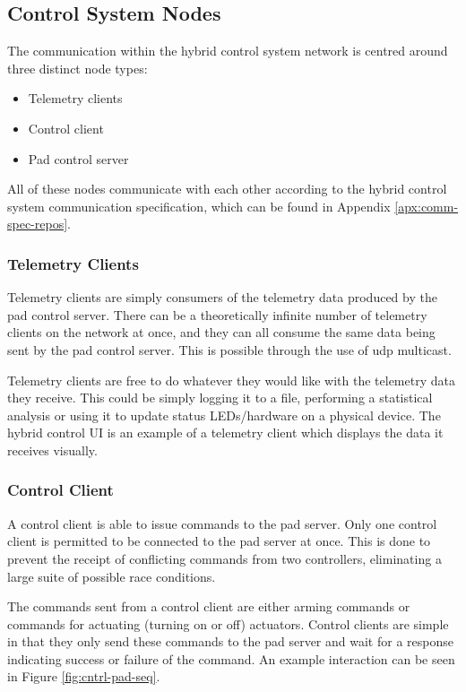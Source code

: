 \subsection{Control System Nodes}

The communication within the hybrid control system network is centred around three distinct node types:

\begin{itemize}
    \item Telemetry clients
    \item Control client
    \item Pad control server
\end{itemize}

All of these nodes communicate with each other according to the hybrid control system communication specification,
which can be found in Appendix \ref{apx:comm-spec-repos}.

\subsubsection{Telemetry Clients}

Telemetry clients are simply consumers of the telemetry data produced by the pad control server. There can be a
theoretically infinite number of telemetry clients on the network at once, and they can all consume the same data being
sent by the pad control server. This is possible through the use of \gls{udp} multicast.

Telemetry clients are free to do whatever they would like with the telemetry data they receive. This could be simply
logging it to a file, performing a statistical analysis or using it to update status LEDs/hardware on a physical
device. The hybrid control UI is an example of a telemetry client which displays the data it receives visually.

\subsubsection{Control Client}

A control client is able to issue commands to the pad server. Only one control client is permitted to be connected to
the pad server at once. This is done to prevent the receipt of conflicting commands from two controllers, eliminating a
large suite of possible race conditions.

The commands sent from a control client are either arming commands or commands for actuating (turning on or off)
actuators. Control clients are simple in that they only send these commands to the pad server and wait for a response
indicating success or failure of the command. An example interaction can be seen in Figure \ref{fig:cntrl-pad-seq}.

